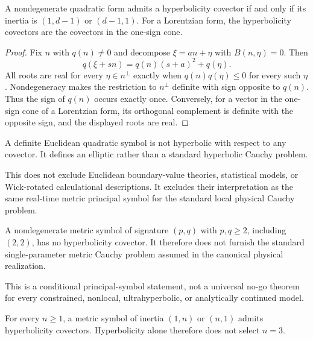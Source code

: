 \documentclass[11pt]{article}
\begin{document}
\begin{theorem}\label{thm:quadratic}
A nondegenerate quadratic form admits a hyperbolicity covector if and only if
its inertia is $(1,d-1)$ or $(d-1,1)$. For a Lorentzian form, the
hyperbolicity covectors are the covectors in the one-sign cone.
\end{theorem}

\begin{proof}
Fix $n$ with $q(n)\ne0$ and decompose
$\xi=a n+\eta$ with $B(n,\eta)=0$. Then
\[
 q(\xi+s n)=q(n)(s+a)^2+q(\eta).
\]
All roots are real for every $\eta\in n^\perp$ exactly when
$q(n)q(\eta)\le0$ for every such $\eta$. Nondegeneracy makes the restriction
to $n^\perp$ definite with sign opposite to $q(n)$. Thus the sign of $q(n)$
occurs exactly once. Conversely, for a vector in the one-sign cone of a
Lorentzian form, its orthogonal complement is definite with the opposite
sign, and the displayed roots are real.
\end{proof}

\begin{corollary}
A definite Euclidean quadratic symbol is not hyperbolic with respect to any
covector. It defines an elliptic rather than a standard hyperbolic Cauchy
problem.
\end{corollary}

This does not exclude Euclidean boundary-value theories, statistical models,
or Wick-rotated calculational descriptions. It excludes their interpretation
as the same real-time metric principal symbol for the standard local physical
Cauchy problem.

\begin{corollary}
A nondegenerate metric symbol of signature $(p,q)$ with $p,q\ge2$, including
$(2,2)$, has no hyperbolicity covector. It therefore does not furnish the
standard single-parameter metric Cauchy problem assumed in the canonical
physical realization.
\end{corollary}

This is a conditional principal-symbol statement, not a universal no-go
theorem for every constrained, nonlocal, ultrahyperbolic, or analytically
continued model.

\begin{corollary}
For every $n\ge1$, a metric symbol of inertia $(1,n)$ or $(n,1)$ admits
hyperbolicity covectors. Hyperbolicity alone therefore does not select
$n=3$.
\end{corollary}
\end{document}
